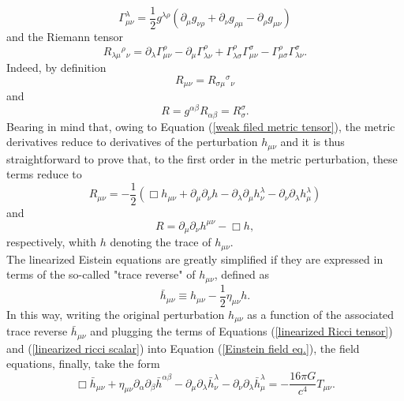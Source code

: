 \documentclass[12pt,twoside,openany]{book}
\begin{document}
\begin{equation}\label{affine connection def}
    \Gamma^\lambda _{\mu\nu}=\frac{1}{2}g^{\lambda \rho}(\partial_\mu g_{\nu\rho}+\partial_\nu g_{\rho\mu}-\partial_\rho g_{\mu\nu})
\end{equation}
and the Riemann tensor
\begin{equation}\label{Riemmann tensor def}
    R_{\lambda\mu}{}^{\rho}{}_{\nu}=\partial_\lambda \Gamma_{\mu\nu}^\rho-\partial_\mu \Gamma_{\lambda\nu}^\rho+\Gamma_{\lambda\sigma}^\rho \Gamma_{\mu\nu}^\sigma-\Gamma_{\mu\sigma}^\rho \Gamma_{\lambda\nu}^\sigma.
\end{equation}
Indeed, by definition
\begin{equation}\label{Ricci tensor def}
    R_{\mu\nu}=R_{\sigma\mu}{}^{\sigma}{}_{\nu}
\end{equation}
and 
\begin{equation}\label{Ricci scalar def} R=g^{\alpha\beta}R_{\alpha\beta}=R_\sigma^\sigma.
\end{equation}
Bearing in mind that, owing to Equation (\ref{weak filed metric tensor}), the metric derivatives reduce to derivatives of the perturbation $h_{\mu\nu}$ and it is thus straightforward to prove that, to the first order in the metric perturbation, these terms reduce to
\begin{equation}\label{linearized Ricci tensor}
    R_{\mu \nu}=-\frac{1}{2}(\Box h_{\mu \nu}+\partial_\mu \partial_\nu h-\partial_\lambda\partial_\mu h_\nu^\lambda-\partial_\nu\partial_\lambda h_\mu^\lambda)
\end{equation}
 and
\begin{equation}\label{linearized ricci scalar}
    R=\partial_\mu \partial_\nu h^{\mu\nu}-\Box h,
\end{equation}
respectively, whith $h$ denoting the trace of $h_{\mu \nu}$.\\The linearized Eistein equations are greatly simplified if they are expressed in terms of the so-called "trace reverse" of $h_{\mu\nu}$, defined as
\begin{equation}\label{trace reverse definition}
    \bar{h}_{\mu\nu}\equiv h_{\mu\nu}-\frac{1}{2}\eta_{\mu\nu} h.
\end{equation}
In this way, writing the original perturbation $h_{\mu\nu}$ as a function of the associated trace reverse $\bar{h}_{\mu\nu}$ and plugging the terms of Equations (\ref{linearized Ricci tensor}) and (\ref{linearized ricci scalar}) into Equation (\ref{Einstein field eq.}), the field equations, finally, take the form
\begin{equation}\label{linearized Einstein Eq. LONG}
    \Box \bar{h}_{\mu\nu} + \eta_{\mu\nu}\partial_\alpha\partial_\beta \bar{h}^{\alpha\beta}-\partial_\mu\partial_\lambda \bar{h}^\lambda_\nu-\partial_\nu\partial_\lambda \bar{h}^\lambda_\mu=-\frac{16\pi G}{c^4}T_{\mu\nu}.
\end{equation}
\end{document}
